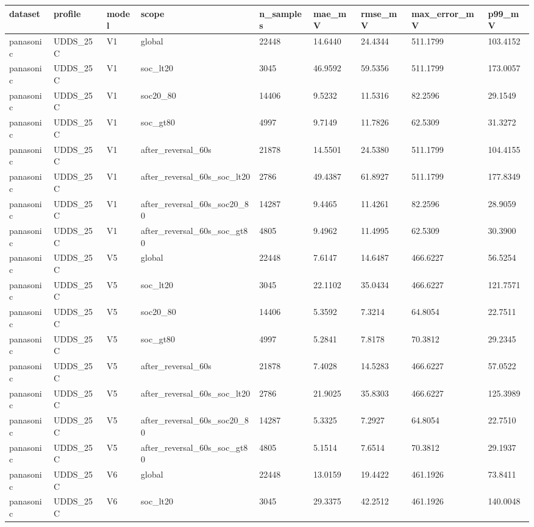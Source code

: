 \begin{tabular}{lllllllll}
\hline
dataset & profile & model & scope & n\_samples & mae\_mV & rmse\_mV & max\_error\_mV & p99\_mV \\
\hline
panasonic & UDDS\_25C & V1 & global & 22448 & 14.6440 & 24.4344 & 511.1799 & 103.4152 \\
panasonic & UDDS\_25C & V1 & soc\_lt20 & 3045 & 46.9592 & 59.5356 & 511.1799 & 173.0057 \\
panasonic & UDDS\_25C & V1 & soc20\_80 & 14406 & 9.5232 & 11.5316 & 82.2596 & 29.1549 \\
panasonic & UDDS\_25C & V1 & soc\_gt80 & 4997 & 9.7149 & 11.7826 & 62.5309 & 31.3272 \\
panasonic & UDDS\_25C & V1 & after\_reversal\_60s & 21878 & 14.5501 & 24.5380 & 511.1799 & 104.4155 \\
panasonic & UDDS\_25C & V1 & after\_reversal\_60s\_soc\_lt20 & 2786 & 49.4387 & 61.8927 & 511.1799 & 177.8349 \\
panasonic & UDDS\_25C & V1 & after\_reversal\_60s\_soc20\_80 & 14287 & 9.4465 & 11.4261 & 82.2596 & 28.9059 \\
panasonic & UDDS\_25C & V1 & after\_reversal\_60s\_soc\_gt80 & 4805 & 9.4962 & 11.4995 & 62.5309 & 30.3900 \\
panasonic & UDDS\_25C & V5 & global & 22448 & 7.6147 & 14.6487 & 466.6227 & 56.5254 \\
panasonic & UDDS\_25C & V5 & soc\_lt20 & 3045 & 22.1102 & 35.0434 & 466.6227 & 121.7571 \\
panasonic & UDDS\_25C & V5 & soc20\_80 & 14406 & 5.3592 & 7.3214 & 64.8054 & 22.7511 \\
panasonic & UDDS\_25C & V5 & soc\_gt80 & 4997 & 5.2841 & 7.8178 & 70.3812 & 29.2345 \\
panasonic & UDDS\_25C & V5 & after\_reversal\_60s & 21878 & 7.4028 & 14.5283 & 466.6227 & 57.0522 \\
panasonic & UDDS\_25C & V5 & after\_reversal\_60s\_soc\_lt20 & 2786 & 21.9025 & 35.8303 & 466.6227 & 125.3989 \\
panasonic & UDDS\_25C & V5 & after\_reversal\_60s\_soc20\_80 & 14287 & 5.3325 & 7.2927 & 64.8054 & 22.7510 \\
panasonic & UDDS\_25C & V5 & after\_reversal\_60s\_soc\_gt80 & 4805 & 5.1514 & 7.6514 & 70.3812 & 29.1937 \\
panasonic & UDDS\_25C & V6 & global & 22448 & 13.0159 & 19.4422 & 461.1926 & 73.8411 \\
panasonic & UDDS\_25C & V6 & soc\_lt20 & 3045 & 29.3375 & 42.2512 & 461.1926 & 140.0048 \\

\end{tabular}

